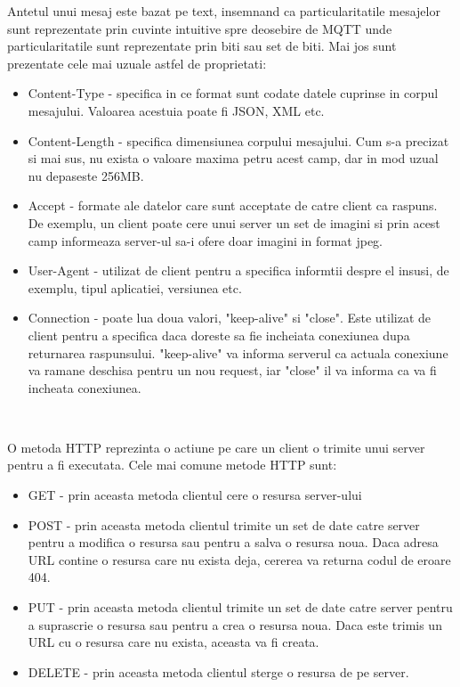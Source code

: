 Antetul unui mesaj este bazat pe text, insemnand ca particularitatile mesajelor sunt reprezentate prin cuvinte intuitive spre deosebire de MQTT unde 
particularitatile sunt reprezentate prin biti sau set de biti. Mai jos sunt prezentate cele mai uzuale astfel de proprietati:
\begin{itemize}
	\item Content-Type - specifica in ce format sunt codate datele cuprinse in corpul mesajului. Valoarea acestuia poate fi JSON, XML etc.
	\item Content-Length - specifica dimensiunea corpului mesajului. Cum s-a precizat si mai sus, nu exista o valoare maxima petru acest camp, dar 
	in mod uzual nu depaseste 256MB.
    \item Accept - formate ale datelor care sunt acceptate de catre client ca raspuns. De exemplu, un client poate cere unui server un set de imagini si 
    prin acest camp informeaza server-ul sa-i ofere doar imagini in format jpeg.
    \item User-Agent - utilizat de client pentru a specifica informtii despre el insusi, de exemplu, tipul aplicatiei, versiunea etc.
    \item Connection - poate lua doua valori, "keep-alive" si "close". Este utilizat de client pentru a specifica daca doreste sa fie incheiata conexiunea 
    dupa returnarea raspunsului. "keep-alive" va informa serverul ca actuala conexiune va ramane deschisa pentru un nou request, iar "close" il va 
    informa ca va fi incheata conexiunea.
\end{itemize}

\

O metoda HTTP reprezinta o actiune pe care un client o trimite unui server pentru a fi executata. Cele mai comune metode HTTP sunt:
\begin{itemize}
	\item GET - prin aceasta metoda clientul cere o resursa server-ului
	\item POST - prin aceasta metoda clientul trimite un set de date catre server pentru a modifica o resursa sau pentru a salva o resursa noua. Daca 
	adresa URL contine o resursa care nu exista deja, cererea va returna codul de eroare 404.
	\item PUT -  prin aceasta metoda clientul trimite un set de date catre server pentru a suprascrie o resursa sau pentru a crea o resursa noua. Daca 
    este trimis un URL cu o resursa care nu exista, aceasta va fi creata.
	\item DELETE - prin aceasta metoda clientul sterge o resursa de pe server.
\end{itemize}

